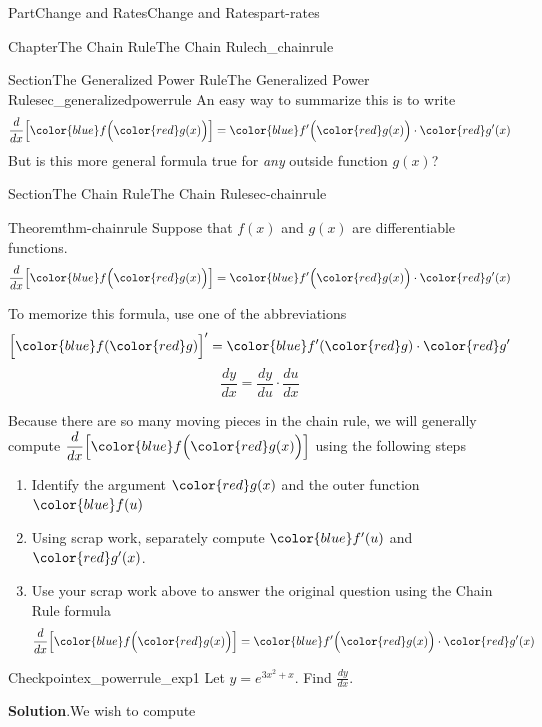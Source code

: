 \documentclass[oneside,10pt,]{tufte-book}
\newcommand{\blocktitlefont}{\relax}
\numberwithin{equation}{chapter}
\newcommand{\red}[1]{   {\color{red}   #1}   }
\newcommand{\blue}[1]{  {\color{blue}  #1}  }
\newcommand{\ddx}[1]{ \dfrac{d}{dx} \Big[ #1 \Big]  }
\newcommand{\D}[1]{ \Big[ #1 \Big]'  }
\begin{document}
\begin{partptx}{Part}{Change and Rates}{}{Change and Rates}{}{}{part-rates}
\begin{chapterptx}{Chapter}{The Chain Rule}{}{The Chain Rule}{}{}{ch_chainrule}
\begin{sectionptx}{Section}{The Generalized Power Rule}{}{The Generalized Power Rule}{}{}{sec_generalizedpowerrule}
An easy way to summarize this is to write%
\begin{equation*}
\ddx{ \blue{ f\Big(\red{g(x)}\Big) } } = \blue{f'\Big( \red{g(x)}\Big)}\cdot \red{g'(x)}
\end{equation*}
But is this more general formula true for \emph{any} outside function \(g(x)\)?%
\end{sectionptx}
%
%
\typeout{************************************************}
\typeout{************************************************}
%
\begin{sectionptx}{Section}{The Chain Rule}{}{The Chain Rule}{}{}{sec-chainrule}
\begin{theorem}{Theorem}{}{}{thm-chainrule}%
Suppose that \(f(x)\) and \(g(x)\) are differentiable functions.%
\begin{equation*}
\ddx{ \blue{ f\Big(\red{g(x)}\Big) } } = \blue{f'\Big( \red{g(x)}\Big)}\cdot \red{g'(x)}
\end{equation*}
%
\par
To memorize this formula, use one of the abbreviations%
\begin{equation*}
\D{ \blue{f(\red{g})} } = \blue{f'(\red{g})} \cdot \red{g'}
\end{equation*}
%
\begin{equation*}
\dfrac{dy}{dx} = \dfrac{dy}{du}\cdot \dfrac{du}{dx}
\end{equation*}
%
\end{theorem}
Because there are so many moving pieces in the chain rule, we will generally compute \(\ddx{ \blue{ f\Big(\red{g(x)}\Big) } }\) using the following steps%
\begin{enumerate}
\item{}Identify the argument \(\red{g(x)}\) and the outer function \(\blue{f(u)}\)%
\item{}Using scrap work, separately compute \(\blue{f'(u)}\) and \(\red{g'(x)}\).%
\item{}Use your scrap work above to answer the original question using the Chain Rule formula%
\begin{equation*}
\ddx{ \blue{ f\Big(\red{g(x)}\Big) } } = \blue{f'\Big( \red{g(x)}\Big)}\cdot \red{g'(x)}
\end{equation*}
%
\end{enumerate}
%
\begin{inlineexercise}{Checkpoint}{}{ex_powerrule_exp1}%
Let \(y= e^{3x^2+x}\).  Find \(\frac{dy}{dx}\).%
\par\smallskip%
\noindent\textbf{\blocktitlefont Solution}.\hypertarget{ex_powerrule_exp1-2}{}\quad{}We wish to compute%

\end{inlineexercise}
\end{sectionptx}
\end{chapterptx}
\end{partptx}
\end{document}
